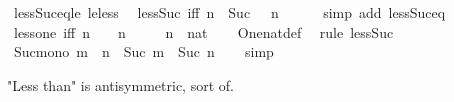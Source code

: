 \begin{isabellebody}
\isamarkupfalse%
\ less{\isacharunderscore}{\kern0pt}Suc{\isacharunderscore}{\kern0pt}eq{\isacharunderscore}{\kern0pt}le\ le{\isacharunderscore}{\kern0pt}less\ \isacommand{{\isachardot}{\kern0pt}{\isachardot}{\kern0pt}}\isamarkupfalse%
%
\endisatagproof
{\isafoldproof}%
%
\isadelimproof
\isanewline
%
\endisadelimproof
\isanewline
{}\isamarkupfalse%
\ less{\isacharunderscore}{\kern0pt}Suc{}\ {\isacharbrackleft}{\kern0pt}iff{\isacharbrackright}{\kern0pt}{\isacharcolon}{\kern0pt}\ {\isachardoublequoteopen}{\isacharparenleft}{\kern0pt}n\ {\isacharless}{\kern0pt}\ Suc\ {}{\isacharparenright}{\kern0pt}\ {\isacharequal}{\kern0pt}\ {\isacharparenleft}{\kern0pt}n\ {\isacharequal}{\kern0pt}\ {}{\isacharparenright}{\kern0pt}{\isachardoublequoteclose}\isanewline
%
\isadelimproof
\ \ %
\endisadelimproof
%
\isatagproof
{}\isamarkupfalse%
\ {\isacharparenleft}{\kern0pt}simp\ add{\isacharcolon}{\kern0pt}\ less{\isacharunderscore}{\kern0pt}Suc{\isacharunderscore}{\kern0pt}eq{\isacharparenright}{\kern0pt}%
\endisatagproof
{\isafoldproof}%
%
\isadelimproof
\isanewline
%
\endisadelimproof
\isanewline
{}\isamarkupfalse%
\ less{\isacharunderscore}{\kern0pt}one\ {\isacharbrackleft}{\kern0pt}iff{\isacharbrackright}{\kern0pt}{\isacharcolon}{\kern0pt}\ {\isachardoublequoteopen}n\ {\isacharless}{\kern0pt}\ {}\ {\isasymlongleftrightarrow}\ n\ {\isacharequal}{\kern0pt}\ {}{\isachardoublequoteclose}\isanewline
\ \ \ n\ {\isacharcolon}{\kern0pt}{\isacharcolon}{\kern0pt}\ nat\isanewline
%
\isadelimproof
\ \ %
\endisadelimproof
%
\isatagproof
{}\isamarkupfalse%
\ One{\isacharunderscore}{\kern0pt}nat{\isacharunderscore}{\kern0pt}def\ \isamarkupfalse%
\ {\isacharparenleft}{\kern0pt}rule\ less{\isacharunderscore}{\kern0pt}Suc{}{\isacharparenright}{\kern0pt}%
\endisatagproof
{\isafoldproof}%
%
\isadelimproof
\isanewline
%
\endisadelimproof
\isanewline
{}\isamarkupfalse%
\ Suc{\isacharunderscore}{\kern0pt}mono{\isacharcolon}{\kern0pt}\ {\isachardoublequoteopen}m\ {\isacharless}{\kern0pt}\ n\ {\isasymLongrightarrow}\ Suc\ m\ {\isacharless}{\kern0pt}\ Suc\ n{\isachardoublequoteclose}\isanewline
%
\isadelimproof
\ \ %
\endisadelimproof
%
\isatagproof
{}\isamarkupfalse%
\ simp%
\endisatagproof
{\isafoldproof}%
%
\isadelimproof
%
\endisadelimproof
%
\begin{isamarkuptext}%
"Less than" is antisymmetric, sort of.%
\end{isamarkuptext}\isamarkuptrue%

\end{isabellebody}
